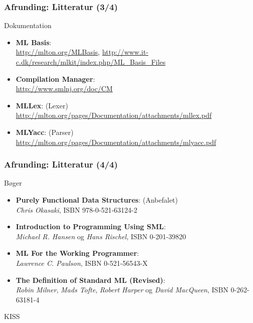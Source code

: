 \documentclass[slidestop,compress,mathserif, xcolor=table]{beamer}
\begin{document}
\begin{frame}
  \frametitle{Afrunding: Litteratur \quad (3/4)}
    Dokumentation
    \begin{itemize}
    \item \textbf{ML Basis}:\\
      {\scriptsize\url{http://mlton.org/MLBasis},
        \url{http://www.it-c.dk/research/mlkit/index.php/ML_Basis_Files}}
    \item \textbf{Compilation Manager}:\\
      {\scriptsize\url{http://www.smlnj.org/doc/CM}}
    \item \textbf{MLLex}: (Lexer)\\
      {\scriptsize\url{http://mlton.org/pages/Documentation/attachments/mllex.pdf}}
    \item \textbf{MLYacc}: (Parser)\\
      {\scriptsize\url{http://mlton.org/pages/Documentation/attachments/mlyacc.pdf}}
    \end{itemize}
\end{frame}

\begin{frame}
  \frametitle{Afrunding: Litteratur \quad (4/4)}
  Bøger
  \begin{itemize}
  \item \textbf{Purely Functional Data Structures}: (Anbefalet)\\
    \textit{Chris Okasaki}, ISBN 978-0-521-63124-2
  \item \textbf{Introduction to Programming Using SML}:\\
    \textit{Michael R. Hansen} og \textit{Hans Rischel}, ISBN 0-201-39820
  \item \textbf{ML For the Working Programmer}:\\
    \textit{Lawrence C. Paulson}, ISBN 0-521-56543-X
  \item \textbf{The Definition of Standard ML (Revised)}:\\
    \textit{Robin Milner}, \textit{Mads Tofte}, \textit{Robert Harper} og
    \textit{David MacQueen}, ISBN 0-262-63181-4
  \end{itemize}
\end{frame}

\begin{frame}[c]
  \begin{center}
    \Huge{KISS}
  \end{center}
\end{frame}
\end{document}
